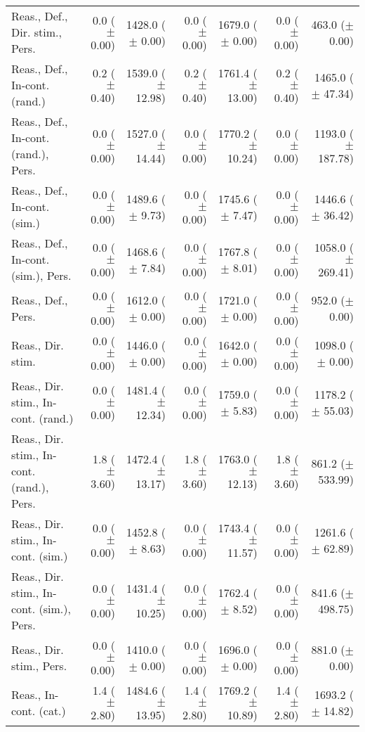 \begin{table*}
\begin{tabular}{lrrrrrr}
        Reas., Def., Dir. stim., Pers. & 0.0 ($\pm$ 0.00) & 1428.0 ($\pm$ 0.00) & 0.0 ($\pm$ 0.00) & 1679.0 ($\pm$ 0.00) & 0.0 ($\pm$ 0.00) & 463.0 ($\pm$ 0.00) \\
        Reas., Def., In-cont. (rand.) & 0.2 ($\pm$ 0.40) & 1539.0 ($\pm$ 12.98) & 0.2 ($\pm$ 0.40) & 1761.4 ($\pm$ 13.00) & 0.2 ($\pm$ 0.40) & 1465.0 ($\pm$ 47.34) \\
        Reas., Def., In-cont. (rand.), Pers. & 0.0 ($\pm$ 0.00) & 1527.0 ($\pm$ 14.44) & 0.0 ($\pm$ 0.00) & 1770.2 ($\pm$ 10.24) & 0.0 ($\pm$ 0.00) & 1193.0 ($\pm$ 187.78) \\
        Reas., Def., In-cont. (sim.) & 0.0 ($\pm$ 0.00) & 1489.6 ($\pm$ 9.73) & 0.0 ($\pm$ 0.00) & 1745.6 ($\pm$ 7.47) & 0.0 ($\pm$ 0.00) & 1446.6 ($\pm$ 36.42) \\
        Reas., Def., In-cont. (sim.), Pers. & 0.0 ($\pm$ 0.00) & 1468.6 ($\pm$ 7.84) & 0.0 ($\pm$ 0.00) & 1767.8 ($\pm$ 8.01) & 0.0 ($\pm$ 0.00) & 1058.0 ($\pm$ 269.41) \\
        Reas., Def., Pers. & 0.0 ($\pm$ 0.00) & 1612.0 ($\pm$ 0.00) & 0.0 ($\pm$ 0.00) & 1721.0 ($\pm$ 0.00) & 0.0 ($\pm$ 0.00) & 952.0 ($\pm$ 0.00) \\
        Reas., Dir. stim. & 0.0 ($\pm$ 0.00) & 1446.0 ($\pm$ 0.00) & 0.0 ($\pm$ 0.00) & 1642.0 ($\pm$ 0.00) & 0.0 ($\pm$ 0.00) & 1098.0 ($\pm$ 0.00) \\
        Reas., Dir. stim., In-cont. (rand.) & 0.0 ($\pm$ 0.00) & 1481.4 ($\pm$ 12.34) & 0.0 ($\pm$ 0.00) & 1759.0 ($\pm$ 5.83) & 0.0 ($\pm$ 0.00) & 1178.2 ($\pm$ 55.03) \\
        Reas., Dir. stim., In-cont. (rand.), Pers. & 1.8 ($\pm$ 3.60) & 1472.4 ($\pm$ 13.17) & 1.8 ($\pm$ 3.60) & 1763.0 ($\pm$ 12.13) & 1.8 ($\pm$ 3.60) & 861.2 ($\pm$ 533.99) \\
        Reas., Dir. stim., In-cont. (sim.) & 0.0 ($\pm$ 0.00) & 1452.8 ($\pm$ 8.63) & 0.0 ($\pm$ 0.00) & 1743.4 ($\pm$ 11.57) & 0.0 ($\pm$ 0.00) & 1261.6 ($\pm$ 62.89) \\
        Reas., Dir. stim., In-cont. (sim.), Pers. & 0.0 ($\pm$ 0.00) & 1431.4 ($\pm$ 10.25) & 0.0 ($\pm$ 0.00) & 1762.4 ($\pm$ 8.52) & 0.0 ($\pm$ 0.00) & 841.6 ($\pm$ 498.75) \\
        Reas., Dir. stim., Pers. & 0.0 ($\pm$ 0.00) & 1410.0 ($\pm$ 0.00) & 0.0 ($\pm$ 0.00) & 1696.0 ($\pm$ 0.00) & 0.0 ($\pm$ 0.00) & 881.0 ($\pm$ 0.00) \\
        Reas., In-cont. (cat.) & 1.4 ($\pm$ 2.80) & 1484.6 ($\pm$ 13.95) & 1.4 ($\pm$ 2.80) & 1769.2 ($\pm$ 10.89) & 1.4 ($\pm$ 2.80) & 1693.2 ($\pm$ 14.82) \\

\end{tabular}
\end{table*}
